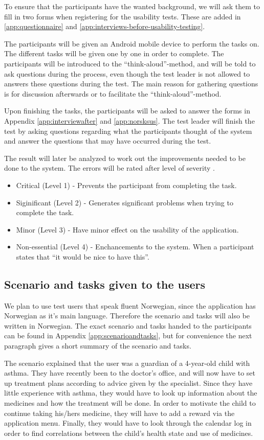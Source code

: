 To ensure that the participants have the wanted background, we will ask them to fill in two forms when registering for the usability tests. These are added in \ref{app:questionnaire} and \ref{app:interviews-before-usability-testing}.


The participants will be given an Android mobile device to perform the tasks on. The different tasks will be given one by one in order to complete. The participants will be introduced to the ``think-aloud''-method, and will be told to ask questions during the process, even though the test leader is not allowed to answers these questions during the test. The main reason for gathering questions is for discussion afterwards or to facilitate the ``think-aloud''-method. 

Upon finishing the tasks, the participants will be asked to answer the forms in Appendix \ref{app:interviewafter} and \ref{app:norsksus}. The test leader will finish the test by asking questions regarding what the participants thought of the system and answer the questions that may have occurred during the test. 

The result will later be analyzed to work out the improvements needed to be done to the system. The errors will be rated after level of severity \cite{dumas1995practical}. 

\begin{itemize}
\item{Critical (Level 1) - Prevents the participant from completing the task.}
\item{Siginificant (Level 2) - Generates significant problems when trying to complete the task.}
\item{Minor (Level 3) - Have minor effect on the usability of the application.}
\item{Non-essential (Level 4) - Enchancements to the system. When a participant states that ``it would be nice to have this''.}
\end{itemize}



\subsection{Scenario and tasks given to the users}
We plan to use test users that speak fluent Norwegian, since the application has Norwegian as it's main language. Therefore the scenario and tasks will also be written in Norwegian. The exact scenario and tasks handed to the participants can be found in Appendix \ref{app:scenarioandtasks}, but for convenience the next paragraph gives a short summary of the scenario and tasks.

The scenario explained that the user was a guardian of a 4-year-old child with asthma. They have recently been to the doctor's office, and will now have to set up treatment plans according to advice given by the specialist. Since they have little experience with asthma, they would have to look up information about the medicines and how the treatment will be done. In order to motivate the child to continue taking his/hers medicine, they will have to add a reward via the application menu. Finally, they would have to look through the calendar log in order to find correlations between the child's health state and use of medicines. 